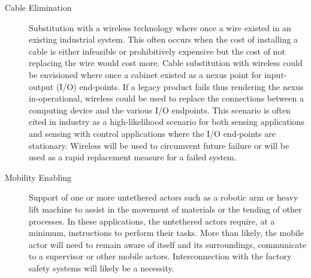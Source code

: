 \begin{description}
	
	\item[Cable Elimination] Substitution with a wireless technology where once a wire existed in an existing industrial system.  This often occurs when the cost of installing a cable is either infeasible or prohibitively expensive but the cost of not replacing the wire would cost more.  Cable substitution with wireless could be envisioned where once a cabinet existed as a nexus point for input-output (I/O) end-points.  If a legacy product fails thus rendering the nexus in-operational, wireless could be used to replace the connections between a computing device and the various I/O endpoints.  This scenario is often cited in industry as a high-likelihood scenario for both sensing applications and sensing with control applications where the I/O end-points are stationary.  Wireless will be used to circumvent future failure or will be used as a rapid replacement measure for a failed system.
	
	\item[Mobility Enabling] Support of one or more untethered actors such as a robotic arm or heavy lift machine to assist in the movement of materials or the tending of other processes.  In these applications, the untethered actors require, at a minimum, instructions to perform their tasks.  More than likely, the mobile actor will need to remain aware of itself and its surroundings, communicate to a supervisor or other mobile actors.  Interconnection with the factory safety systems will likely be a necessity.
	
\end{description}



